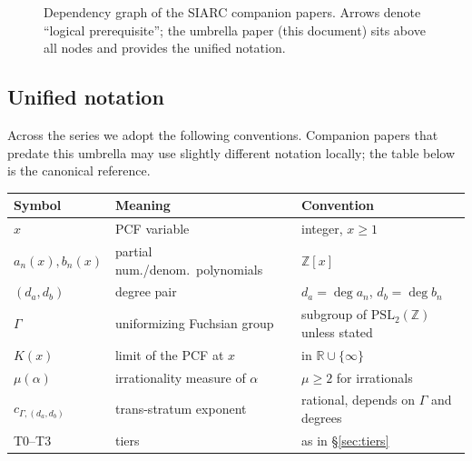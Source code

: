 \documentclass[11pt,a4paper]{article}
\theoremstyle{definition}
\theoremstyle{remark}
\newcommand{\PSLZ}{\mathrm{PSL}_2(\mathbb{Z})}
\newcommand{\Z}{\mathbb{Z}}
\newcommand{\R}{\mathbb{R}}
\begin{document}
\begin{figure}[h]
\centering
{}
\caption{Dependency graph of the SIARC companion papers. Arrows
denote ``logical prerequisite''; the umbrella paper (this document)
sits above all nodes and provides the unified notation.}
\label{fig:depgraph}
\end{figure}

\subsection{Unified notation}

Across the series we adopt the following conventions. Companion papers
that predate this umbrella may use slightly different notation locally;
the table below is the canonical reference.

\begin{center}
\begin{tabular}{@{}lll@{}}
\toprule
Symbol & Meaning & Convention \\
\midrule
$x$ & PCF variable & integer, $x \geq 1$ \\
$a_n(x), b_n(x)$ & partial num./denom.\ polynomials & $\Z[x]$ \\
$(d_a, d_b)$ & degree pair & $d_a = \deg a_n$, $d_b = \deg b_n$ \\
$\Gamma$ & uniformizing Fuchsian group & subgroup of $\PSLZ$ unless stated \\
$K(x)$ & limit of the PCF at $x$ & in $\R \cup \{\infty\}$ \\
$\mu(\alpha)$ & irrationality measure of $\alpha$ & $\mu \geq 2$ for irrationals \\
$c_{\Gamma,(d_a,d_b)}$ & trans-stratum exponent & rational, depends on $\Gamma$ and degrees \\
T0--T3 & tiers & as in \S\ref{sec:tiers} \\
\bottomrule
\end{tabular}
\end{center}
\end{document}
